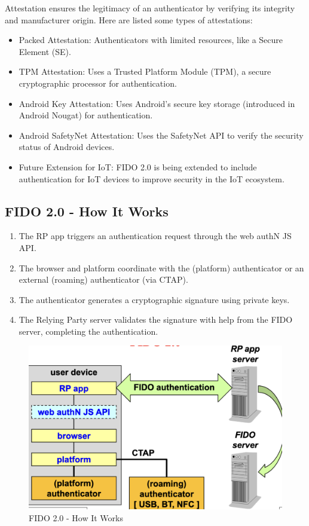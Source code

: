 Attestation ensures the legitimacy of an authenticator by verifying its integrity and manufacturer origin. Here are listed some types of attestations:
\begin{itemize}
    \item Packed Attestation: Authenticators with limited resources, like a Secure Element (SE).
    \item TPM Attestation: Uses a Trusted Platform Module (TPM), a secure cryptographic processor for authentication.
    \item Android Key Attestation: Uses Android’s secure key storage (introduced in Android Nougat) for authentication.
    \item Android SafetyNet Attestation: Uses the SafetyNet API to verify the security status of Android devices.
    \item Future Extension for IoT: FIDO 2.0 is being extended to include authentication for IoT devices to improve security in the IoT ecosystem.
\end{itemize}

\subsection*{FIDO 2.0 - How It Works}
\begin{enumerate}
    \item The RP app triggers an authentication request through the web authN JS API.
    \item The browser and platform coordinate with the (platform) authenticator or an external (roaming) authenticator (via CTAP).
    \item The authenticator generates a cryptographic signature using private keys.
    \item The Relying Party server validates the signature with help from the FIDO server, completing the authentication.
\end{enumerate}

\begin{figure}[H]
    \centering
    \includegraphics[width=0.5\linewidth]{Images/Authentication/fido2.png}
    \caption{FIDO 2.0 - How It Works}
\end{figure}